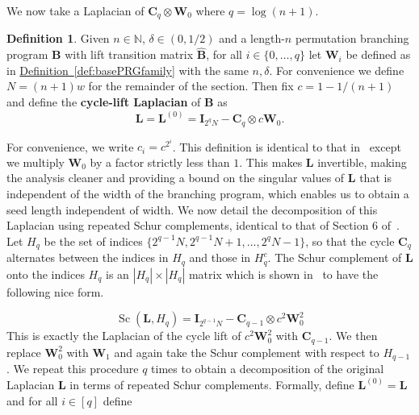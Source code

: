 \documentclass[11pt]{article}
\numberwithin{equation}{section}
\theoremstyle{definition}
\newtheorem{definition}[theorem]{Definition}
\theoremstyle{plain}
\newcommand{\N}{\mathbb N}
\newcommand{\expref}[2]{\hyperref[#2]{#1~\ref{#2}}}
\newcommand{\mC}{\mathbf{C}}
\newcommand{\mW}{\mathbf{W}}
\newcommand{\mL}{\mathbf{L}}
\newcommand{\I}{\mathbf{I}}
\DeclareMathOperator{\Sc}{Sc}
\newcommand{\bp}{{\mathbf{B}}}
\newcommand{\hbp}{{\mathbf{\hat{B}}}}
\begin{document}
We now take a Laplacian of $\mC_q\otimes \mW_0$ where $q=\log(n+1)$. 
\begin{definition}\label{def:cycleDecomp}
Given $n\in \N$, $\delta\in(0,1/2)$ and a length-$n$ permutation branching program $\bp$ with lift transition matrix $\hbp$, for all $i\in \{0,\dots,q\}$ let $\mW_i$ be defined as in \expref{Definition}{def:basePRGfamily} with the same $n,\delta$. For convenience we define $N=(n+1)w$ for the remainder of the section. Then fix $c=1-1/(n+1)$ and define the \textbf{cycle-lift Laplacian} of $\bp$ as
$$\mL=\mL^{(0)}=\I_{2^qN}-\mC_q\otimes c\mW_0.$$
\end{definition}
For convenience, we write $c_i=c^{2^i}$. This definition is identical to that in~\cite{AhmadinejadKeMuPeSiVa19} except we multiply $\mW_0$ by a factor strictly less than $1$. This makes $\mL$ invertible, making the analysis cleaner and providing a bound on the singular values of $\mL$ that is independent of the width of the branching program, which enables us to obtain a seed length independent of width. We now detail the decomposition of this Laplacian using repeated Schur complements, identical to that of Section 6 of~\cite{AhmadinejadKeMuPeSiVa19}.\\

Let $H_q$ be the set of indices $\{2^{q-1}N,2^{q-1}N+1,\dots ,2^q N-1\}$, so that the cycle $\mC_q$ alternates between the indices in $H_q$ and those in $H^c_q$. The Schur complement of $\mL$ onto the indices $H_q$ is an $|H_q|\times|H_q|$ matrix which is shown in~\cite{AhmadinejadKeMuPeSiVa19} to have the following nice form. %

\[\Sc(\mL,H_q)=\I_{2^{q-1}N}-\mC_{q-1}\otimes c^2\mW_0^2\]
This is exactly the Laplacian of the cycle lift of $c^2\mW_0^2$ with $\mC_{q-1}$. We then replace $\mW_0^2$ with $\mW_1$ and again take the Schur complement with respect to $H_{q-1}$. We repeat this procedure $q$ times to obtain a decomposition of the original Laplacian $\mL$ in terms of repeated Schur complements. Formally, define $\mL^{(0)}=\mL$ and for all $i\in [q]$ define
\end{document}
